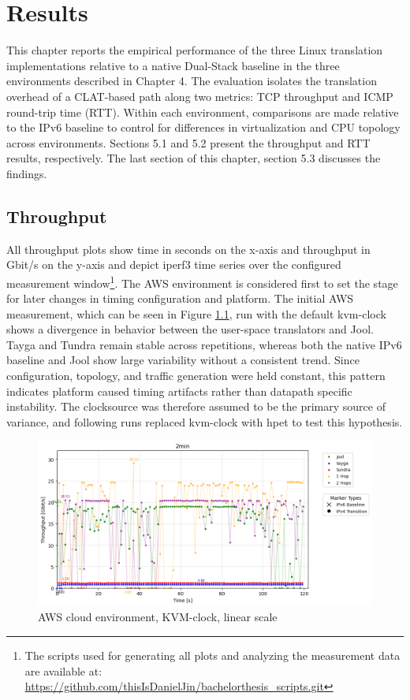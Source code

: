 \chapter{Results}
This chapter reports the empirical performance of the three Linux translation implementations relative to a native Dual-Stack baseline in the three environments described in Chapter 4. The evaluation isolates the translation overhead of a CLAT-based path along two metrics: TCP throughput and ICMP round-trip time (RTT). Within each environment, comparisons are made relative to the IPv6 baseline to control for differences in virtualization and CPU topology across environments. Sections 5.1 and 5.2 present the throughput and RTT results, respectively. The last section of this chapter, section 5.3 discusses the findings.

\section{Throughput}
All throughput plots show time in seconds on the x-axis and throughput in Gbit/s on the y-axis and depict iperf3 time series over the configured measurement window\footnote{The scripts used for generating all plots and analyzing the measurement data are available at: \url{https://github.com/thisIsDanielJin/bachelorthesis_scripts.git}}. The AWS environment is considered first to set the stage for later changes in timing configuration and platform.
The initial AWS measurement, which can be seen in Figure \ref{fig:AWS_tcp_sameScale_kvm-clock_linear}, run with the default kvm-clock shows a divergence in behavior between the user-space translators and Jool. Tayga and Tundra remain stable across repetitions, whereas both the native IPv6 baseline and Jool show large variability without a consistent trend. Since configuration, topology, and traffic generation were held constant, this pattern indicates platform caused timing artifacts rather than datapath specific instability. The clocksource was therefore assumed to be the primary source of variance, and following runs replaced kvm-clock with hpet to test this hypothesis.

\begin{figure}[H]
    \centering
    \includegraphics[width=1\textwidth]{resources/finalPlots/combinedplots/AWS_tcp_sameScale_kvm-clock_2min_linear.png}
    \caption{AWS cloud environment, KVM-clock, linear scale}
    \label{fig:AWS_tcp_sameScale_kvm-clock_linear}

\end{figure}

